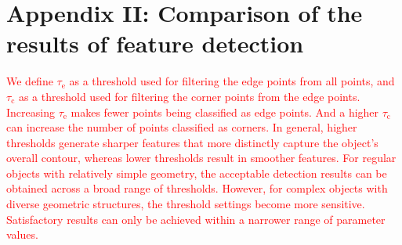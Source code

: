 \documentclass[onecolumn]{IEEEtran}
\newcommand{\rev}[1]{\textcolor{red}{#1}}
\begin{document}
\section{Appendix II: Comparison of the results of feature detection}

\rev{We define $\tau_\text{e}$ as a threshold used for filtering the edge points from all points, and $\tau_\text{c}$ as a threshold used for filtering the corner points from the edge points. Increasing $\tau_\text{e}$ makes fewer points being classified as edge points. And a higher $\tau_\text{c}$ can increase the number of points classified as corners.
In general, higher thresholds generate sharper features that more distinctly capture the object’s overall contour, whereas lower thresholds result in smoother features.
For regular objects with relatively simple geometry, the acceptable detection results can be obtained across a broad range of thresholds. However, for complex objects with diverse geometric structures, the threshold settings become more sensitive. Satisfactory results can only be achieved within a narrower range of parameter values.}
\end{document}
